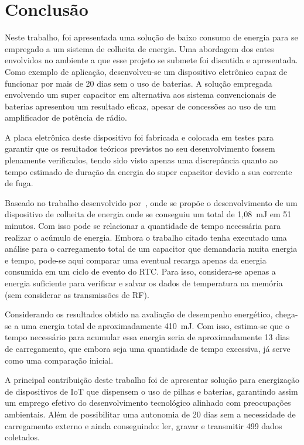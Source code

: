 \chapter{Conclusão}
Neste trabalho, foi apresentada uma solução de baixo consumo de energia para se empregado a um sistema de colheita de energia. Uma abordagem dos entes envolvidos no ambiente a que esse projeto se submete foi discutida e apresentada. Como exemplo de aplicação, desenvolveu-se um dispositivo eletrônico capaz de funcionar por mais de 20 dias sem o uso de baterias. A solução empregada envolvendo um super capacitor em alternativa aos sistema convencionais de baterias apresentou um resultado eficaz, apesar de concessões ao uso de um amplificador de potência de rádio.

A placa eletrônica deste dispositivo foi fabricada e colocada em testes para garantir que os resultados teóricos previstos no seu desenvolvimento fossem plenamente verificados, tendo sido visto apenas uma discrepância quanto ao tempo estimado de duração da energia do super capacitor devido a sua corrente de fuga.

Baseado no trabalho desenvolvido por~, onde se propõe o desenvolvimento de um dispositivo de colheita de energia onde se conseguiu um total de 1,08~mJ em 51 minutos. Com isso pode se relacionar a quantidade de tempo necessária para realizar o acúmulo de energia. Embora o trabalho citado tenha executado uma análise para o carregamento total de um capacitor que demandaria muita energia e tempo, pode-se aqui comparar uma eventual recarga apenas da energia consumida em um ciclo de evento do RTC. Para isso, considera-se apenas a energia suficiente para verificar e salvar os dados de temperatura na memória (sem considerar as transmissões de RF). 

Considerando os resultados obtido na avaliação de desempenho energético, chega-se a uma energia total de aproximadamente 410~mJ. Com isso, estima-se que o tempo necessário para acumular essa energia seria de aproximadamente 13 dias de carregamento, que embora seja uma quantidade de tempo excessiva, já serve como uma comparação inicial.

A principal contribuição deste trabalho foi de apresentar solução para energização de dispositivos de IoT que dispensem o uso de pilhas e baterias, garantindo assim um emprego efetivo do desenvolvimento tecnológico alinhado com preocupações ambientais. Além de possibilitar uma autonomia de 20 dias sem a necessidade de carregamento externo e ainda conseguindo: ler, gravar e transmitir 499 dados coletados.


